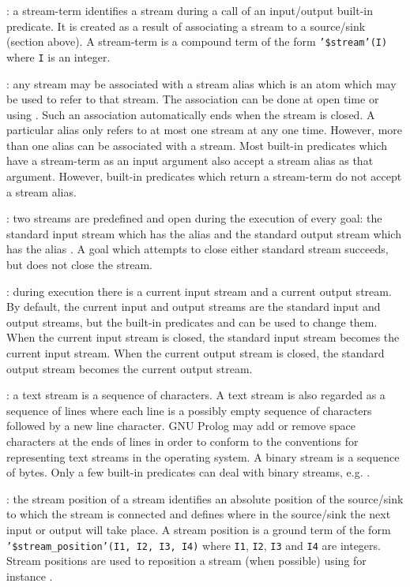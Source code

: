 : a stream-term identifies a stream during a call of an
input/output built-in predicate. It is created as a result of associating a
stream to a source/sink (section above). A stream-term is a compound term of
the form \texttt{'\$stream'(I)} where \texttt{I} is an integer.

: any stream may be associated with a stream alias
which is an atom which may be used to refer to that stream. The association
can be done at open time or using 
. Such an association automatically ends when the
stream is closed. A particular alias only refers to at most one stream at any
one time. However, more than one alias can be associated with a stream. Most
built-in predicates which have a stream-term as an input argument also accept
a stream alias as that argument. However, built-in predicates which return a
stream-term do not accept a stream alias.

: two streams are predefined and open during the
execution of every goal: the standard input stream which has the alias
 and the standard output stream which has the alias
. A goal which attempts to close either standard stream
succeeds, but does not close the stream.

: during execution there is a current input stream
and a current output stream. By default, the current input and output
streams are the standard input and output streams, but the built-in
predicates   and
  can be used to change them.
When the current input stream is closed, the standard input stream becomes
the current input stream. When the current output stream is closed, the
standard output stream becomes the current output stream. 

: a text stream is a sequence of
characters. A text stream is also regarded as a sequence of lines where each
line is a possibly empty sequence of characters followed by a new line
character. GNU Prolog may add or remove space characters at the ends of lines
in order to conform to the conventions for representing text streams in the
operating system. A binary stream is a sequence of bytes. Only a few
built-in predicates can deal with binary streams, e.g.
 .

: the stream position of a stream identifies an
absolute position of the source/sink to which the stream is connected and
defines where in the source/sink the next input or output will take place. A
stream position is a ground term of the form
\texttt{'\$stream\_position'(I1, I2, I3, I4)} where \texttt{I1},
\texttt{I2}, \texttt{I3} and \texttt{I4} are integers. Stream positions are
used to reposition a stream (when possible) using for instance
 .

